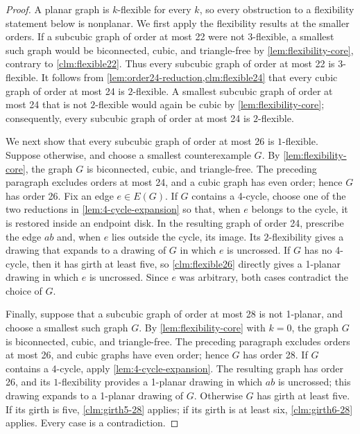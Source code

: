 \documentclass[a4paper,11pt]{article}
\theoremstyle{plain}
\theoremstyle{definition}  %
\begin{document}
\begin{proof}
    A planar graph is $k$-flexible for every $k$, so every obstruction to a
    flexibility statement below is nonplanar.  We first apply the flexibility
    results at the smaller orders.  If a subcubic graph of order at most 22
    were not $3$-flexible, a smallest such graph would be biconnected, cubic,
    and triangle-free by
    \cref{lem:flexibility-core}, contrary to \cref{clm:flexible22}.  Thus every
    subcubic graph of order at most 22 is $3$-flexible.  It follows from
    \cref{lem:order24-reduction,clm:flexible24} that every cubic graph of order
    at most 24 is $2$-flexible.  A smallest subcubic graph of order at most 24
    that is not $2$-flexible would again be cubic by
    \cref{lem:flexibility-core}; consequently, every subcubic graph of order
    at most 24 is $2$-flexible.

    We next show that every subcubic graph of order at most 26 is
    $1$-flexible.  Suppose otherwise, and choose a smallest counterexample
    $G$.  By \cref{lem:flexibility-core}, the graph $G$ is biconnected, cubic,
    and triangle-free.  The preceding paragraph excludes orders at most 24,
    and a cubic graph has even order; hence $G$ has order 26.  Fix an edge
    $e\in E(G)$.  If $G$ contains a 4-cycle, choose one of the
    two reductions in \cref{lem:4-cycle-expansion} so that, when $e$ belongs
    to the cycle, it is restored inside an endpoint disk.  In the resulting
    graph of order 24, prescribe the edge $ab$ and, when $e$ lies outside the
    cycle, its image.  Its $2$-flexibility gives a drawing that expands to a
    drawing of $G$ in which $e$ is uncrossed.  If $G$ has no 4-cycle, then it
    has girth at least five, so \cref{clm:flexible26} directly gives a
    1-planar drawing in which $e$ is uncrossed.  Since $e$ was arbitrary,
    both cases contradict the choice of $G$.

    Finally, suppose that a subcubic graph of order at most 28 is not
    1-planar, and choose a smallest such graph $G$.  By
    \cref{lem:flexibility-core} with $k=0$, the graph $G$ is biconnected,
    cubic, and triangle-free.  The preceding paragraph excludes orders at
    most 26, and cubic graphs have even order; hence $G$ has order 28.  If $G$
    contains a 4-cycle, apply
    \cref{lem:4-cycle-expansion}.  The resulting graph has order 26, and its
    $1$-flexibility provides a 1-planar drawing in which $ab$ is uncrossed;
    this drawing expands to a 1-planar drawing of $G$.  Otherwise $G$ has
    girth at least five.  If its girth is five, \cref{clm:girth5-28} applies;
    if its girth is at least six, \cref{clm:girth6-28} applies.  Every case is
    a contradiction.
\end{proof}







\end{document}
